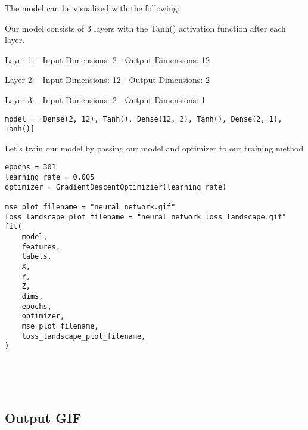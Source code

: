 \documentclass[openany]{book}
\begin{document}
    The model can be visualized with the following:

    Our model consists of 3 layers with the Tanh() activation function after
each layer.

Layer 1: - Input Dimensions: 2 - Output Dimensions: 12

Layer 2: - Input Dimensions: 12 - Output Dimensions: 2

Layer 3: - Input Dimensions: 2 - Output Dimensions: 1

\begin{tcolorbox}
\tiny
\begin{verbatim}
model = [Dense(2, 12), Tanh(), Dense(12, 2), Tanh(), Dense(2, 1), Tanh()]
\end{verbatim}
\end{tcolorbox}

    Let's train our model by passing our model and optimizer to our training
method

\begin{tcolorbox}
\tiny
\begin{verbatim}
epochs = 301
learning_rate = 0.005
optimizer = GradientDescentOptimizier(learning_rate)

mse_plot_filename = "neural_network.gif"
loss_landscape_plot_filename = "neural_network_loss_landscape.gif"
fit(
    model,
    features,
    labels,
    X,
    Y,
    Z,
    dims,
    epochs,
    optimizer,
    mse_plot_filename,
    loss_landscape_plot_filename,
)
\end{verbatim}
\end{tcolorbox}

    \begin{center}
    \end{center}
    { \hspace*{\fill} \\}
    
    \begin{center}
    \end{center}
    { \hspace*{\fill} \\}
    
    \subsection{Output GIF}\label{output-gif}
\end{document}

